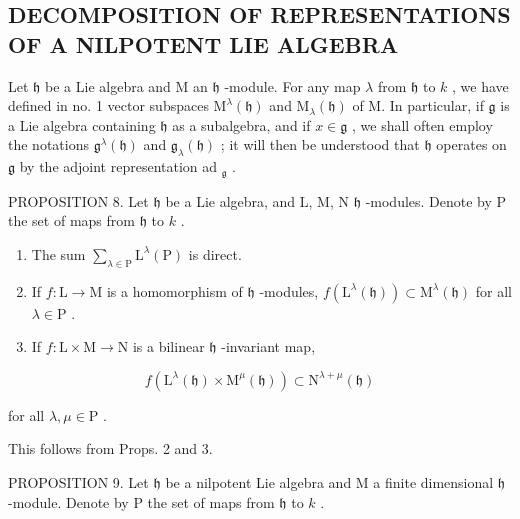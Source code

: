 \subsection{DECOMPOSITION OF REPRESENTATIONS OF A NILPOTENT LIE ALGEBRA}

Let \(\mathfrak{h}\) be a Lie algebra and M an \(\mathfrak{h}\) -module. For any map \(\lambda\) from \(\mathfrak{h}\) to \(k\) , we have defined in no. 1 vector subspaces \(\mathrm{M}^{\lambda}(\mathfrak{h})\) and \(\mathrm{M}_{\lambda}(\mathfrak{h})\) of M. In particular, if \(\mathfrak{g}\) is a Lie algebra containing \(\mathfrak{h}\) as a subalgebra, and if \(x \in \mathfrak{g}\) , we shall often employ the notations \(\mathfrak{g}^{\lambda}(\mathfrak{h})\) and \(\mathfrak{g}_{\lambda}(\mathfrak{h})\) ; it will then be understood that \(\mathfrak{h}\) operates on \(\mathfrak{g}\) by the adjoint representation ad \(_{\mathfrak{g}}\) .

PROPOSITION 8. Let \(\mathfrak{h}\) be a Lie algebra, and L, M, N \(\mathfrak{h}\) -modules. Denote by P the set of maps from \(\mathfrak{h}\) to \(k\) .

\begin{enumerate}
\def\labelenumi{(\roman{enumi})}
\item
  The sum \(\sum_{\lambda \in \mathrm{P}}\mathrm{L}^{\lambda}(\mathrm{P})\) is direct.
\item
  If \(f: \mathrm{L} \to \mathrm{M}\) is a homomorphism of \(\mathfrak{h}\) -modules, \(f(\mathrm{L}^{\lambda}(\mathfrak{h})) \subset \mathrm{M}^{\lambda}(\mathfrak{h})\) for all \(\lambda \in \mathrm{P}\) .
\item
  If \(f:\mathrm{L}\times \mathrm{M}\to \mathrm{N}\) is a bilinear \(\mathfrak{h}\) -invariant map,
\end{enumerate}

\[
f (\mathrm{L} ^ {\lambda} (\mathfrak {h}) \times \mathrm{M} ^ {\mu} (\mathfrak {h})) \subset \mathrm{N} ^ {\lambda + \mu} (\mathfrak {h})
\]

for all \(\lambda, \mu \in \mathrm{P}\) .

This follows from Props. 2 and 3.

PROPOSITION 9. Let \(\mathfrak{h}\) be a nilpotent Lie algebra and M a finite dimensional \(\mathfrak{h}\) -module. Denote by P the set of maps from \(\mathfrak{h}\) to \(k\) .

